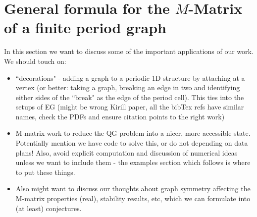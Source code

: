 \section{General formula for the $M$-Matrix of a finite period graph} \label{sec:Discussion}
In this section we want to discuss some of the important applications of our work.
We should touch on:
\begin{itemize}
	\item ``decorations" - adding a graph to a periodic 1D structure by attaching at a vertex (or better: taking a graph, breaking an edge in two and identifying either sides of the ``break" as the edge of the period cell).
	This ties into the setups of EG \cite{cherednichenko2019time} (might be wrong Kirill paper, all the bibTex refs have similar names, check the PDFs and ensure citation points to the right work)
	\item M-matrix work to reduce the QG problem into a nicer, more accessible state.
	Potentially mention we have code to solve this, or do not depending on data plans!
	Also, avoid explicit computation and discussion of numerical ideas unless we want to include them - the examples section which follows is where to put these things.
	\item Also might want to discuss our thoughts about graph symmetry affecting the M-matrix properties (real), stability results, etc, which we can formulate into (at least) conjectures.
\end{itemize}

